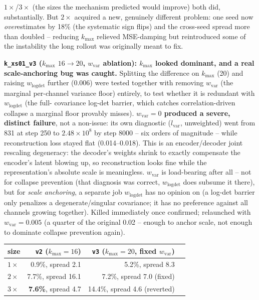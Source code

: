 \documentclass[11pt]{article}
\begin{document}
$1\times$/$3\times$ (the sizes the mechanism predicted would improve)
both did, substantially. But $2\times$ acquired a new, genuinely
different problem: one seed now \emph{over}estimates by 18\% (the
systematic sign flips) and the cross-seed spread more than doubled --
reducing $k_{\max}$ relieved MSE-damping but reintroduced some of the
instability the long rollout was originally meant to fix.

\textbf{\texttt{k\_xs01\_v3} ($k_{\max}$ $16\to20$, $w_{\mathrm{var}}$
ablation): $k_{\max}$ looked dominant, and a real scale-anchoring bug was
caught.} Splitting the difference on $k_{\max}$ (20) and raising
$w_{\mathrm{logdet}}$ further (0.006) were tested together with removing
$w_{\mathrm{var}}$ (the marginal per-channel variance floor) entirely, to
test whether it is redundant with $w_{\mathrm{logdet}}$ (the full-
covariance log-det barrier, which catches correlation-driven collapse a
marginal floor provably misses). \textbf{$w_{\mathrm{var}}{=}0$ produced a
severe, distinct failure}, not a non-issue: its own diagnostic ($l_{\mathrm{var}}$,
unweighted) went from 831 at step 250 to $2.48\times10^8$ by step 8000 --
six orders of magnitude -- while reconstruction loss stayed flat
(0.014--0.018). This is an encoder/decoder joint rescaling degeneracy:
the decoder's weights shrink to exactly compensate the encoder's latent
blowing up, so reconstruction looks fine while the representation's
absolute scale is meaningless. $w_{\mathrm{var}}$ is load-bearing after
all -- not for collapse prevention (that diagnosis was correct,
$w_{\mathrm{logdet}}$ does subsume it there), but for \emph{scale
anchoring}, a separate job $w_{\mathrm{logdet}}$ has no opinion on (a
log-det barrier only penalizes a degenerate/singular covariance; it has
no preference against all channels growing together). Killed immediately
once confirmed; relaunched with $w_{\mathrm{var}}{=}0.005$ (a quarter of
the original 0.02 -- enough to anchor scale, not enough to dominate
collapse prevention again).

\begin{center}
\begin{tabular}{lrrr}
\toprule
size & \texttt{v2} ($k_{\max}{=}16$) & \texttt{v3} ($k_{\max}{=}20$, fixed $w_{\mathrm{var}}$) \\
\midrule
$1\times$ & 0.9\%, spread 2.1  & 5.2\%, spread 8.3 \\
$2\times$ & 7.7\%, spread 16.1 & 7.2\%, spread 7.0 (fixed) \\
$3\times$ & \textbf{7.6\%}, spread 4.7 & 14.4\%, spread 4.6 (reverted) \\
\bottomrule
\end{tabular}
\end{center}
\end{document}
